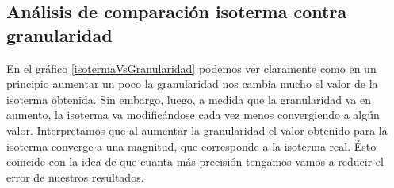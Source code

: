 \subsection{Análisis de comparación isoterma contra granularidad}
En el gráfico \ref{isotermaVsGranularidad} podemos ver claramente como en un principio aumentar un poco la granularidad nos cambia mucho el valor de la isoterma obtenida. Sin embargo, luego, a medida que la granularidad va en aumento, la isoterma va modificándose cada vez menos convergiendo a algún valor. Interpretamos que al aumentar la granularidad el valor obtenido para la isoterma converge a una magnitud, que corresponde a la isoterma real. Ésto coincide con la idea de que cuanta más precisión tengamos vamos a reducir el error de nuestros resultados.

